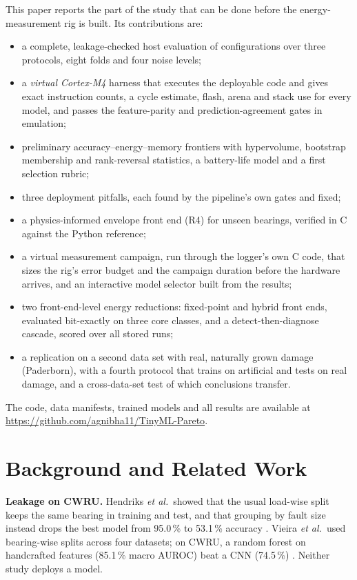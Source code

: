 \documentclass[conference]{IEEEtran}
\begin{document}
This paper reports the part of the study that can be done before the energy-measurement rig is built. Its
contributions are:
\begin{itemize}
\item a complete, leakage-checked host evaluation of \NumConfigs{} configurations over three protocols, eight folds and
four noise levels;
\item a \emph{virtual Cortex-M4} harness that executes the deployable code and gives exact instruction counts, a cycle
estimate, flash, arena and stack use for every model, and passes the feature-parity and prediction-agreement gates
in emulation;
\item preliminary accuracy--energy--memory frontiers with hypervolume, bootstrap membership and rank-reversal
statistics, a battery-life model and a first selection rubric;
\item three deployment pitfalls, each found by the pipeline's own gates and fixed;
\item a physics-informed envelope front end (R4) for unseen bearings, verified in C against the Python reference;
\item a virtual measurement campaign, run through the logger's own C code, that sizes the rig's error budget and the
campaign duration before the hardware arrives, and an interactive model selector built from the results;
\item two front-end-level energy reductions: fixed-point and hybrid front ends, evaluated bit-exactly on three core
classes, and a detect-then-diagnose cascade, scored over all \NumRuns{} stored runs;
\item a replication on a second data set with real, naturally grown damage (Paderborn), with a fourth protocol that
trains on artificial and tests on real damage, and a cross-data-set test of which conclusions transfer.
\end{itemize}
The code, data manifests, trained models and all results are available at
\url{https://github.com/agnibha11/TinyML-Pareto}.

\section{Background and Related Work}
\textbf{Leakage on CWRU.} Hendriks \emph{et al.}\ showed that the usual load-wise split keeps the same bearing in
training and test, and that grouping by fault size instead drops the best model from 95.0\,\% to 53.1\,\% accuracy
\cite{hendriks2022towards}. Vieira \emph{et al.}\ used bearing-wise splits across four datasets; on CWRU, a random
forest on handcrafted features (85.1\,\% macro AUROC) beat a CNN (74.5\,\%) \cite{vieira2026towards}. Neither study
deploys a model.
\end{document}
